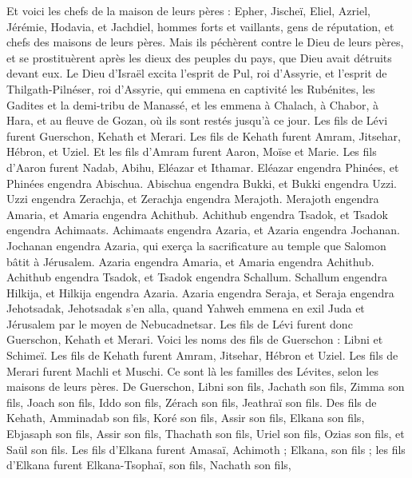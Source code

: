\begin{multicols}{2}
Et voici les chefs de la maison de leurs pères : Epher, Jischeï, Eliel, Azriel, Jérémie, Hodavia, et Jachdiel, hommes forts et vaillants, gens de réputation, et chefs des maisons de leurs pères.
Mais ils péchèrent contre le Dieu de leurs pères, et se prostituèrent après les dieux des peuples du pays, que Dieu avait détruits devant eux.
Le Dieu d'Israël excita l'esprit de Pul, roi d’Assyrie, et l'esprit de Thilgath-Pilnéser, roi d’Assyrie,  qui emmena en captivité les Rubénites, les Gadites et la demi-tribu de Manassé, et les emmena à Chalach, à Chabor, à Hara, et au fleuve de Gozan, où ils sont restés jusqu'à ce jour.
\VerseOne{}Les fils de Lévi furent Guerschon, Kehath et Merari.
Les fils de Kehath furent  Amram, Jitsehar, Hébron, et Uziel.
Et les fils d'Amram furent Aaron, Moïse et Marie. Les fils d'Aaron furent  Nadab, Abihu, Eléazar et Ithamar.
Eléazar engendra Phinées, et Phinées engendra Abischua.
Abischua engendra Bukki, et Bukki engendra Uzzi.
Uzzi engendra Zerachja, et Zerachja engendra Merajoth.
Merajoth engendra Amaria, et Amaria engendra Achithub.
Achithub engendra Tsadok, et Tsadok engendra Achimaats.
Achimaats engendra Azaria, et Azaria engendra Jochanan.
Jochanan engendra Azaria, qui exerça la sacrificature au temple que Salomon bâtit à Jérusalem.
Azaria engendra Amaria, et Amaria engendra Achithub.
Achithub engendra Tsadok, et Tsadok engendra Schallum.
Schallum engendra Hilkija, et Hilkija engendra Azaria.
Azaria engendra Seraja, et Seraja engendra Jehotsadak,
Jehotsadak s'en alla, quand Yahweh emmena en exil Juda et Jérusalem par le moyen de Nebucadnetsar.
Les fils de Lévi  furent donc  Guerschon, Kehath et Merari.
Voici les noms des fils de Guerschon : Libni et Schimeï.
Les fils de Kehath furent Amram, Jitsehar, Hébron et Uziel.
Les fils de Merari furent  Machli et Muschi. Ce sont là les familles des Lévites, selon les maisons de leurs pères.
De Guerschon, Libni son fils, Jachath son fils, Zimma son fils,
Joach son fils, Iddo son fils, Zérach son fils, Jeathraï son fils.
Des fils de Kehath, Amminadab son fils, Koré son fils, Assir son fils,
Elkana son fils, Ebjasaph son fils, Assir son fils,
Thachath son fils, Uriel son fils, Ozias son fils, et Saül son fils.
Les fils d’Elkana furent  Amasaï, Achimoth ;
Elkana, son fils ; les fils d’Elkana furent Elkana-Tsophaï, son fils, Nachath son fils,

\end{multicols}

